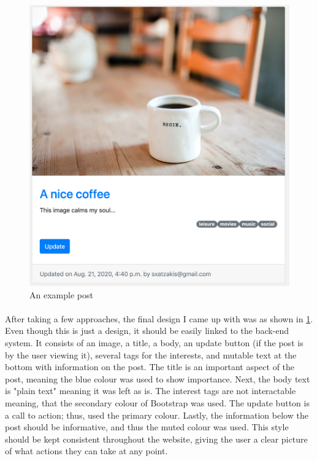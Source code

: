 \begin{figure}[htbp]
\begin{minipage}[t]{0.45\linewidth}
    \includegraphics[width=\linewidth]{Figures/post_example}
    \caption{An example post}
    \label{example_post}
\end{minipage}
\end{figure}

\paragraph{}

After taking a few approaches, the final design I came up with was as shown in \ref{example_post}. Even though this is just a design, it should be easily linked to the back-end system. It consists of an image, a title, a body, an update button (if the post is by the user viewing it), several tags for the interests, and mutable text at the bottom with information on the post. The title is an important aspect of the post, meaning the blue colour was used to show importance. Next, the body text is "plain text" meaning it was left as is. The interest tags are not interactable meaning, that the secondary colour of Bootstrap was used. The update button is a call to action; thus, used the primary colour. Lastly, the information below the post should be informative, and thus the muted colour was used. This style should be kept consistent throughout the website, giving the user a clear picture of what actions they can take at any point.

